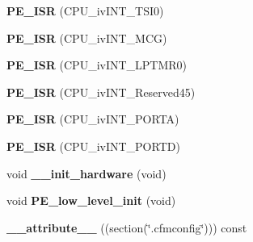 \begin{DoxyCompactItemize}
\item 
\mbox{\label{group___c_p_u__module_ga55bcacc59d6bf5c4141dd4cb24d3fed0}} 
{\bfseries P\+E\+\_\+\+I\+SR} (C\+P\+U\+\_\+iv\+I\+N\+T\+\_\+\+T\+S\+I0)
\item 
\mbox{\label{group___c_p_u__module_ga635941e1ce4adb02b7cf24eff16035f6}} 
{\bfseries P\+E\+\_\+\+I\+SR} (C\+P\+U\+\_\+iv\+I\+N\+T\+\_\+\+M\+CG)
\item 
\mbox{\label{group___c_p_u__module_ga05ec6e55327f3e6b619fda74eb550c4e}} 
{\bfseries P\+E\+\_\+\+I\+SR} (C\+P\+U\+\_\+iv\+I\+N\+T\+\_\+\+L\+P\+T\+M\+R0)
\item 
\mbox{\label{group___c_p_u__module_ga37c4e46cecd425e2de68cf0e73162512}} 
{\bfseries P\+E\+\_\+\+I\+SR} (C\+P\+U\+\_\+iv\+I\+N\+T\+\_\+\+Reserved45)
\item 
\mbox{\label{group___c_p_u__module_gad764b244bfe3c09b6cc37232bd2f1961}} 
{\bfseries P\+E\+\_\+\+I\+SR} (C\+P\+U\+\_\+iv\+I\+N\+T\+\_\+\+P\+O\+R\+TA)
\item 
\mbox{\label{group___c_p_u__module_gad24e5f7e840e2090e99b9df8debcc8db}} 
{\bfseries P\+E\+\_\+\+I\+SR} (C\+P\+U\+\_\+iv\+I\+N\+T\+\_\+\+P\+O\+R\+TD)
\item 
\mbox{\label{group___c_p_u__module_ga32a8d86789a3326b3120bf1e1c1d4252}} 
void {\bfseries \+\_\+\+\_\+init\+\_\+hardware} (void)
\item 
\mbox{\label{group___c_p_u__module_ga95039f54c45f24c1b4ed640fa2f63f11}} 
void {\bfseries P\+E\+\_\+low\+\_\+level\+\_\+init} (void)
\item 
\mbox{\label{group___c_p_u__module_ga2d9b5b981f451cdf47bf43b4f9cc9e03}} 
{\bfseries \+\_\+\+\_\+attribute\+\_\+\+\_\+} ((section(\char`\"{}.cfmconfig\char`\"{}))) const
\end{DoxyCompactItemize}
